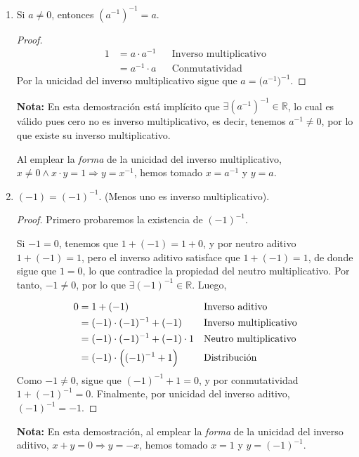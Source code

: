 \documentclass[11pt]{article}
\newcommand{\R}{\mathbb{R}}
\begin{document}
\begin{enumerate}[label=\alph*)]
 \item Si $a\neq 0$, entonces $\left( a^{-1} \right)^{-1}=a$.
 \begin{proof} 
  \begin{align*}
   1 &= a\cdot a^{-1} && \text{Inverso multiplicativo}\\
   &= a^{-1} \cdot a && \text{Conmutatividad}
  \end{align*} Por la unicidad del inverso multiplicativo sigue que $a=\bigl(a^{-1}\bigr)^{-1}$.
 \end{proof}
 \textbf{Nota:} En esta demostración está implícito que $\exists\left( a^{-1} \right)^{-1}\in \R$, lo cual es válido pues cero no es inverso multiplicativo, es decir, tenemos $a^{-1}\neq 0$, por lo que existe su inverso multiplicativo.
 
 Al emplear la \textit{forma} de la unicidad del inverso multiplicativo, $x\neq 0 \land x\cdot y=1 \Longrightarrow y = x^{-1}$, hemos tomado $x=a^{-1}$ y $y=a$.

 \item $(-1)=(-1)^{-1}$. (Menos uno es inverso multiplicativo).
 
 \begin{proof} Primero probaremos la existencia de $(-1)^{-1}$.
  
 Si $-1=0$, tenemos que $1+(-1)=1+0$, y por neutro aditivo $1+(-1)=1$, pero el inverso aditivo satisface que $1+(-1)=1$, de donde sigue que $1=0$, lo que contradice la propiedad del neutro multiplicativo. Por tanto, $-1\neq 0$, por lo que $\exists (-1)^{-1}\in \R$. Luego,

 \vspace{-1em} \begin{align*}
  0 &= 1 + (-1) && \text{Inverso aditivo}\\
  &= (-1)\cdot (-1)^{-1} + (-1) && \text{Inverso multiplicativo}\\
  &= (-1)\cdot (-1)^{-1} + (-1) \cdot 1 && \text{Neutro multiplicativo}\\
  &= (-1) \cdot \Bigl((-1)^{-1} + 1\Bigr) && \text{Distribución}
 \end{align*} Como $-1\neq 0$, sigue que $(-1)^{-1} + 1=0$, y por conmutatividad $1+(-1)^{-1}=0$. Finalmente, por unicidad del inverso aditivo, $(-1)^{-1}=-1$.
 \end{proof}
 \textbf{Nota:} En esta demostración, al emplear la \textit{forma} de la unicidad del inverso aditivo, $x+y=0 \Longrightarrow y=-x$, hemos tomado $x=1$ y $y=(-1)^{-1}$.


\end{enumerate}
\end{document}
